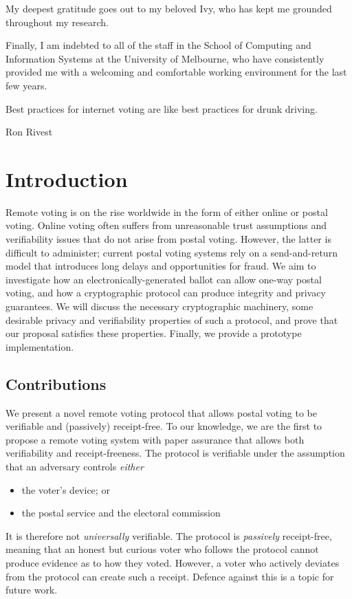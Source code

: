 \documentclass[12pt,a4paper]{article}
\theoremstyle{definition}
\begin{document}
My deepest gratitude goes out to my beloved Ivy, who has kept me grounded throughout my research.

Finally, I am indebted to all of the staff in the School of Computing and Information Systems at the University of Melbourne, who have consistently provided me with a welcoming and comfortable working environment for the last few years.
\newpage
\listoffigures
\newpage
\epigraph{Best practices for internet voting are like best practices for drunk driving.}{Ron Rivest}
\section{Introduction}
Remote voting is on the rise worldwide in the form of either online or postal voting. Online voting often suffers from unreasonable trust assumptions and verifiability issues that do not arise from postal voting. However, the latter is difficult to administer; current postal voting systems rely on a send-and-return model that introduces long delays and opportunities for fraud. We aim to investigate how an electronically-generated ballot can allow one-way postal voting, and how a cryptographic protocol can produce integrity and privacy guarantees. We will discuss the necessary cryptographic machinery, some desirable privacy and verifiability properties of such a protocol, and prove that our proposal satisfies these properties. Finally, we provide a prototype implementation.

\subsection{Contributions}
We present a novel remote voting protocol that allows postal voting to be verifiable and (passively) receipt-free. To our knowledge, we are the first to propose a remote voting system with paper assurance that allows both verifiability and receipt-freeness. The protocol is verifiable under the assumption that an adversary controls \textit{either}
\begin{itemize}
    \item the voter's device; or
    \item the postal service and the electoral commission
\end{itemize}
It is therefore not \textit{universally} verifiable. The protocol is \textit{passively} receipt-free, meaning that an honest but curious voter who follows the protocol cannot produce evidence as to how they voted. However, a voter who actively deviates from the protocol can create such a receipt. Defence against this is a topic for future work.
\end{document}
